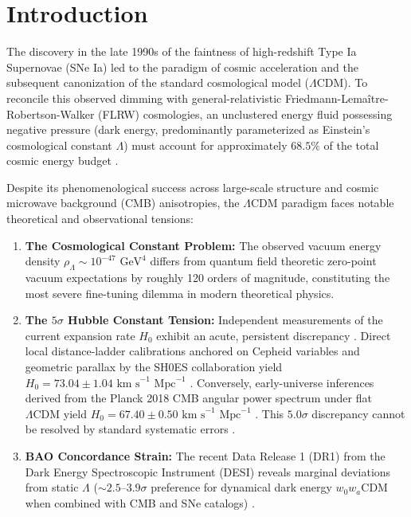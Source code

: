 \documentclass[aps,prd,reprint,superscriptaddress,nofootinbib,floatfix,amsmath,amssymb]{revtex4-2}
\begin{document}
\maketitle

\section{Introduction}
\label{sec:intro}

The discovery in the late 1990s of the faintness of high-redshift Type Ia Supernovae (SNe Ia) led to the paradigm of cosmic acceleration \cite{Riess1998,Perlmutter1999} and the subsequent canonization of the standard cosmological model ($\Lambda\text{CDM}$). To reconcile this observed dimming with general-relativistic Friedmann-Lema\^{i}tre-Robertson-Walker (FLRW) cosmologies, an unclustered energy fluid possessing negative pressure (dark energy, predominantly parameterized as Einstein's cosmological constant $\Lambda$) must account for approximately $68.5\%$ of the total cosmic energy budget \cite{Planck2018_Cosmology}.

Despite its phenomenological success across large-scale structure and cosmic microwave background (CMB) anisotropies, the $\Lambda\text{CDM}$ paradigm faces notable theoretical and observational tensions:
\begin{enumerate}
    \item \textbf{The Cosmological Constant Problem:} The observed vacuum energy density $\rho_\Lambda \sim 10^{-47}\text{ GeV}^4$ differs from quantum field theoretic zero-point vacuum expectations by roughly 120 orders of magnitude, constituting the most severe fine-tuning dilemma in modern theoretical physics.
    \item \textbf{The $5\sigma$ Hubble Constant Tension:} Independent measurements of the current expansion rate $H_0$ exhibit an acute, persistent discrepancy \cite{Verde2019,DiValentino2021}. Direct local distance-ladder calibrations anchored on Cepheid variables and geometric parallax by the SH0ES collaboration yield $H_0 = 73.04 \pm 1.04\text{ km s}^{-1}\text{ Mpc}^{-1}$ \cite{Riess2022_SH0ES}. Conversely, early-universe inferences derived from the Planck 2018 CMB angular power spectrum under flat $\Lambda\text{CDM}$ yield $H_0 = 67.40 \pm 0.50\text{ km s}^{-1}\text{ Mpc}^{-1}$ \cite{Planck2018_Cosmology}. This $5.0\sigma$ discrepancy cannot be resolved by standard systematic errors \cite{Freedman2021}.
    \item \textbf{BAO Concordance Strain:} The recent Data Release 1 (DR1) from the Dark Energy Spectroscopic Instrument (DESI) reveals marginal deviations from static $\Lambda$ ($\sim 2.5\text{--}3.9\sigma$ preference for dynamical dark energy $w_0 w_a$CDM when combined with CMB and SNe catalogs) \cite{DESI2024_BAO}.
\end{enumerate}
\end{document}
